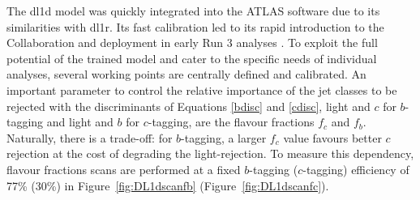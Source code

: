 The \gls{dl1d} model was quickly integrated into the ATLAS software due to its similarities with \gls{dl1r}. Its fast calibration led to its rapid introduction to the Collaboration and deployment in early Run 3 analyses \cite{ATLAS-CONF-2022-070}. To exploit the full potential of the trained model and cater to the specific needs of individual analyses, several working points are centrally defined and calibrated. An important parameter to control the relative importance of the jet classes to be rejected with the discriminants of Equations \ref{bdisc} and \ref{cdisc}, light and $c$ for $b$-tagging and light and $b$ for $c$-tagging, are the flavour fractions $f_c$ and $f_b$. Naturally, there is a trade-off: for $b$-tagging, a larger $f_c$ value favours better $c$rejection at the cost of degrading the light-rejection. To measure this dependency, flavour fractions scans are performed at a fixed $b$-tagging ($c$-tagging) efficiency of 77\% (30\%) in Figure~\ref{fig:DL1dscanfb} (Figure~\ref{fig:DL1dscanfc}). \\

